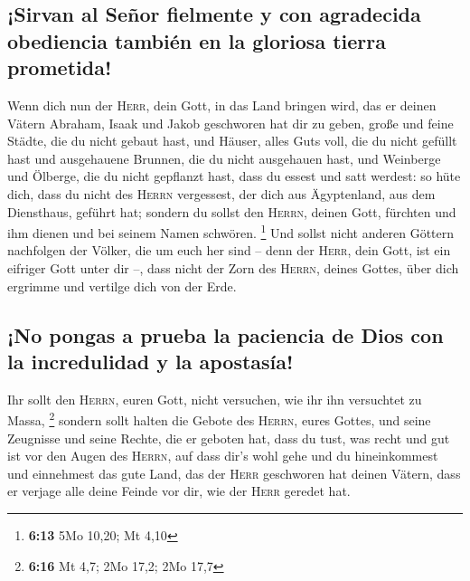 \hypertarget{sirvan-al-seuxf1or-fielmente-y-con-agradecida-obediencia-tambiuxe9n-en-la-gloriosa-tierra-prometida}{%
\subsection{¡Sirvan al Señor fielmente y con agradecida obediencia
también en la gloriosa tierra
prometida!}\label{sirvan-al-seuxf1or-fielmente-y-con-agradecida-obediencia-tambiuxe9n-en-la-gloriosa-tierra-prometida}}

 Wenn dich nun der \textsc{Herr}, dein Gott, in das Land
bringen wird, das er deinen Vätern Abraham, Isaak und Jakob geschworen
hat dir zu geben, große und feine Städte, die du nicht gebaut hast,
 und Häuser, alles Guts voll, die du nicht gefüllt hast
und ausgehauene Brunnen, die du nicht ausgehauen hast, und Weinberge und
Ölberge, die du nicht gepflanzt hast, dass du essest und satt werdest:
 so hüte dich, dass du nicht des \textsc{Herrn}
vergessest, der dich aus Ägyptenland, aus dem Diensthaus, geführt hat;
 sondern du sollst den \textsc{Herrn}, deinen Gott,
fürchten und ihm dienen und bei seinem Namen schwören. \footnote{\textbf{6:13}
  5Mo 10,20; Mt 4,10}  Und sollst nicht anderen Göttern
nachfolgen der Völker, die um euch her sind --  denn der
\textsc{Herr}, dein Gott, ist ein eifriger Gott unter dir --, dass nicht
der Zorn des \textsc{Herrn}, deines Gottes, über dich ergrimme und
vertilge dich von der Erde.

\hypertarget{no-pongas-a-prueba-la-paciencia-de-dios-con-la-incredulidad-y-la-apostasuxeda}{%
\subsection{¡No pongas a prueba la paciencia de Dios con la incredulidad
y la
apostasía!}\label{no-pongas-a-prueba-la-paciencia-de-dios-con-la-incredulidad-y-la-apostasuxeda}}

 Ihr sollt den \textsc{Herrn}, euren Gott, nicht
versuchen, wie ihr ihn versuchtet zu Massa, \footnote{\textbf{6:16} Mt
  4,7; 2Mo 17,2; 2Mo 17,7}  sondern sollt halten die
Gebote des \textsc{Herrn}, eures Gottes, und seine Zeugnisse und seine
Rechte, die er geboten hat,  dass du tust, was recht und
gut ist vor den Augen des \textsc{Herrn}, auf dass dir's wohl gehe und
du hineinkommest und einnehmest das gute Land, das der \textsc{Herr}
geschworen hat deinen Vätern,  dass er verjage alle deine
Feinde vor dir, wie der \textsc{Herr} geredet hat.

